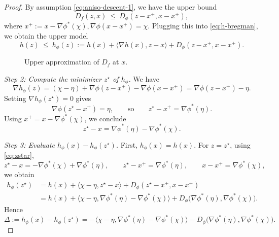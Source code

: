\documentclass[10pt,a4paper]{amsart}
\providecommand{\paragraph}{}
\begin{document}
\begin{proof}
By assumption \eqref{eq:aniso-descent-1}, we have the upper bound
\[
D_f(z,x)\ \le\ D_\phi(z-x^+,x-x^+),
\]
where 
$x^+:=x-\nabla\phi^*(\chi), \nabla\phi(x-x^+)=\chi.$
Plugging this into \eqref{eq:h-bregman}, we obtain the upper model
\[
h(z)\ \le\ h_\phi(z)
:= h(x)+\langle \nabla h(x),z-x\rangle + D_\phi(z-x^+,x-x^+).
\]

\begin{figure}[htbp]
\begin{center}

\caption{Upper approximation of $D_f$ at $x$.}
\label{fig:upper}
\end{center}
\end{figure}

\paragraph{\em Step 2: Compute the minimizer $z^\star$ of $h_\phi$.}
We have
\[
\nabla h_\phi(z)
=
(\chi-\eta)+\nabla\phi(z-x^+)-\nabla\phi(x-x^+)
= \nabla\phi(z-x^+) - \eta.
\]
Setting $\nabla h_\phi(z^\star)=0$ gives
\[
\nabla\phi(z^\star-x^+)=\eta,
\qquad\text{so}\qquad
z^\star-x^+ = \nabla\phi^*(\eta).
\]
Using $x^+=x-\nabla\phi^*(\chi)$, we conclude
\begin{equation}\label{eq:zstar}
z^\star
- x=
\nabla\phi^*(\eta) -\nabla\phi^*(\chi).
\end{equation}


\paragraph{\em Step 3: Evaluate $h_\phi(x)-h_\phi(z^\star)$.}
First, $h_\phi(x)=h(x)$.
For $z=z^\star$, using \eqref{eq:zstar},
\[
z^\star-x
=
-\nabla\phi^*(\chi)+\nabla\phi^*(\eta),
\qquad
z^\star-x^+
=\nabla\phi^*(\eta),
\qquad
x-x^+=\nabla\phi^*(\chi),
\]
we obtain
\begin{align*}
h_\phi(z^\star)
&=
h(x)+\langle \chi-\eta,z^\star-x\rangle
+D_\phi(z^\star-x^+,x-x^+)\\
&=
h(x)+\langle \chi-\eta,\nabla\phi^*(\eta)-\nabla\phi^*(\chi)\rangle
+D_\phi\bigl(\nabla\phi^*(\eta),\nabla\phi^*(\chi)\bigr).
\end{align*}
Hence
\begin{equation}\label{eq:delta-def}
\Delta
:=
h_\phi(x)-h_\phi(z^\star)
=
-\langle \chi-\eta,\nabla\phi^*(\eta)-\nabla\phi^*(\chi)\rangle
- D_\phi\bigl(\nabla\phi^*(\eta),\nabla\phi^*(\chi)\bigr).
\end{equation}


\end{proof}
\end{document}
